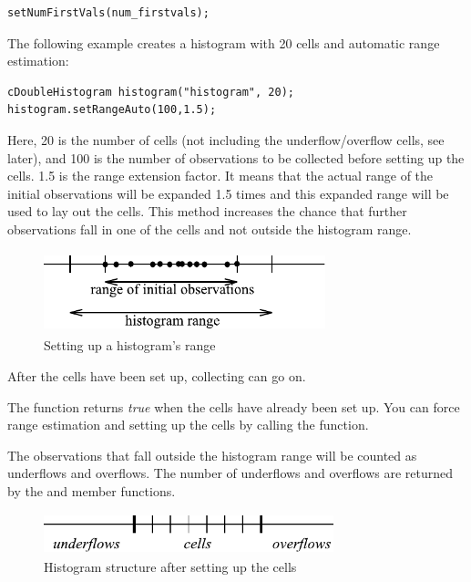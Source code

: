 \begin{verbatim}
setNumFirstVals(num_firstvals);
\end{verbatim}

The following example creates a histogram with 20 cells and automatic
range estimation:

\begin{verbatim}
cDoubleHistogram histogram("histogram", 20);
histogram.setRangeAuto(100,1.5);
\end{verbatim}


Here, 20 is the number of cells (not including the underflow/overflow
cells, see later), and 100 is the number of observations to be
collected before setting up the cells. 1.5 is the range extension
factor. It means that the actual range of the initial observations
will be expanded 1.5 times and this expanded range will be used to lay
out the cells. This method increases the chance that further
observations fall in one of the cells and not outside the histogram
range.

\begin{figure}[htbp]
  \begin{center}
    \includegraphics[width=3.215in, height=0.930in]{figures/usmanFig12}
    \caption{Setting up a histogram's range}
  \end{center}
\end{figure}

After the cells have been set up, collecting can go on.

The  function returns \textit{true} when the cells have
already been set up. You can force range estimation and setting
up the cells by calling the  function.

The observations that fall outside the histogram range will be counted
as underflows and overflows. The number of underflows and overflows
are returned by the  and 
member functions.

\begin{figure}[htbp]
\begin{center}
  \includegraphics[width=3.310in, height=0.467in]{figures/usmanFig13}
  \caption{Histogram structure after setting up the cells}
\end{center}
\end{figure}

